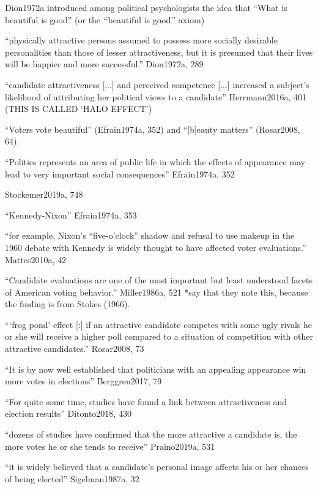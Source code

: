
Dion1972a introduced among political psychologists the idea that ``What is beautiful is good'' (or the ‘‘beautiful is good’’ axiom)

``physically attractive persons assumed to possess more socially desirable personalities than those of lesser attractiveness, but it is presumed that their lives will be happier and more successful.'' Dion1972a, 289

``candidate attractiveness [...] and perceived competence [...] increased a subject's likelihood of attributing her political views to a candidate'' Herrmann2016a, 401 (THIS IS CALLED `HALO EFFECT')

``Voters vote beautiful'' (Efrain1974a, 352) and ``[b]eauty matters'' (Rosar2008, 64).

``Politics represents an area of public life in which the effects of appearance may lead to very important social consequences'' Efrain1974a, 352


		Stockemer2019a, 748

		``Kennedy-Nixon'' Efrain1974a, 353

		``for example, Nixon’s “five-o’clock” shadow and refusal to use makeup in the 1960 debate with Kennedy is widely thought to have affected voter evaluations.'' Mattes2010a, 42

``Candidate evaluations are one of the most important but least understood facets of American voting behavior.'' Miller1986a, 521 *say that they note this, because the finding is from Stokes (1966).

``‘frog pond’ effect [:] if an attractive candidate competes with some ugly rivals he or she will receive a higher poll compared to a situation of competition with other attractive candidates.'' Rosar2008, 73


		``It is by now well established that politicians with an appealing appearance win more votes in elections'' Berggren2017, 79

		``For quite some time, studies have found a link between attractiveness and election results'' Ditonto2018, 430

		``dozens of studies have confirmed that the more attractive a candidate is, the more votes he or she tends to receive'' Praino2019a, 531

		``it is widely believed that a candidate's personal image affects his or her chances of being elected'' Sigelman1987a, 32


